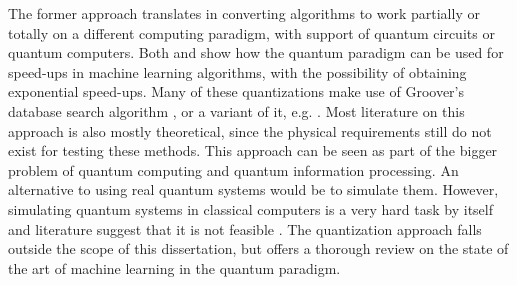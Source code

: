 The former approach translates in converting algorithms to work partially or totally on a different computing paradigm, with support of quantum circuits or quantum computers.
Both \citet{Aimeur2013} and \citet{Lloyd2013} show how the quantum paradigm can be used for speed-ups in machine learning algorithms, with the possibility of obtaining exponential speed-ups.
Many of these quantizations make use of Groover's database search algorithm \cite{grover1996fast}, or a variant of it, e.g. \citet{Wiebe2014}.
Most literature on this approach is also mostly theoretical, since the physical requirements still do not exist for testing these methods.
This approach can be seen as part of the bigger problem of quantum computing and quantum information processing.
An alternative to using real quantum systems would be to simulate them.
However, simulating quantum systems in classical computers is a very hard task by itself and literature suggest that it is not feasible \cite{Feynman1982}.
The quantization approach falls outside the scope of this dissertation, but \citet{wittek2014quantum} offers a thorough review on the state of the art of machine learning in the quantum paradigm.

